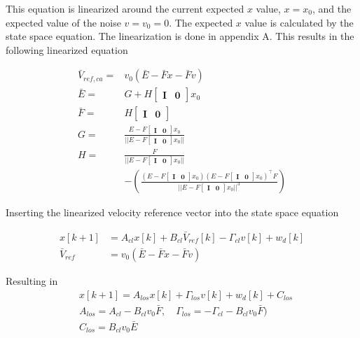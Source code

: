 This equation is linearized around the current expected $x$ value, $x=x_0$, and the expected value of the noise $v=v_0=0$. The expected $x$ value is calculated by the state space equation. The linearization is done in appendix A. This results in the following linearized equation

\begin{align}
        \bar{V}_{ref,ca}  ={}& v_0 (\bar{E} - \bar{F} x -\bar{F} v) \\
        \bar{E} ={}&  G + H \begin{bmatrix}\mathbf{I}  &\mathbf{0}\end{bmatrix} x_0 \\
        \bar{F} ={}& H \begin{bmatrix}\mathbf{I}  &\mathbf{0}\end{bmatrix} \\
        G ={}& \frac{E - F \begin{bmatrix}\mathbf{I}  &\mathbf{0}\end{bmatrix} x_0}{||E - F \begin{bmatrix}\mathbf{I}  &\mathbf{0}\end{bmatrix} x_0||} \\
        H ={}& \frac{F}{||E - F \begin{bmatrix}\mathbf{I}  &\mathbf{0}\end{bmatrix} x_0||}\\
                &-\left(\frac{(E - F \begin{bmatrix}\mathbf{I}  &\mathbf{0}\end{bmatrix} x_0)(E - F \begin{bmatrix}\mathbf{I}  &\mathbf{0}\end{bmatrix} x_0)^\top F}{||E - F \begin{bmatrix}\mathbf{I}  &\mathbf{0}\end{bmatrix} x_0||^3}\right)
\end{align}

Inserting the linearized velocity reference vector into the state space equation

\begin{align}
 x[k+1] & = A_{cl} x[k] + B_{cl} \bar{V}_{ref}[k] - \Gamma_{cl} v[k] +w_d[k] \\
 \bar{V}_{ref} & = v_0 (\bar{E} - \bar{F} x -\bar{F} v)
\end{align}

Resulting in
\begin{align}
 & x[k+1]   = A_{los} x[k] + \Gamma_{los} v[k] + w_d[k] + C_{los} \\ \label{linearized_los_eq}
 & A_{los}  = A_{cl} - B_{cl} v_0 \bar{F}, \quad \Gamma_{los} =  -\Gamma_{cl} - B_{cl} v_0 \bar{F})\\ & C_{los} = B_{cl} v_0 \bar{E}
\end{align}

